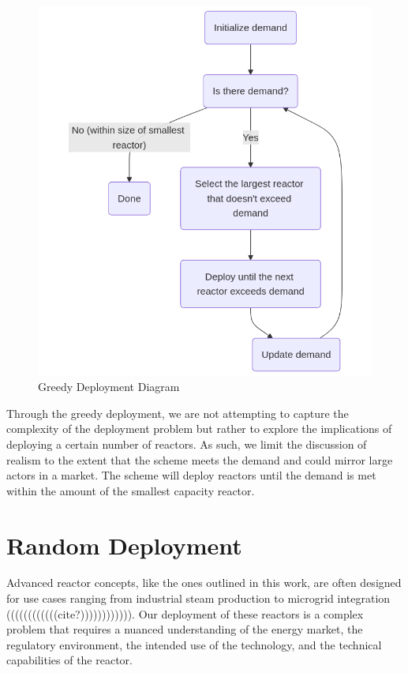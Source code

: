 \begin{figure}[!htbp]
    \centering
    \includegraphics[scale=0.4]{images/schemes/greedy_diagram.png}
    \caption{Greedy Deployment Diagram}
    \label{fig:greedy_diagram}
\end{figure}

Through the greedy deployment, we are not attempting to capture the complexity
of the deployment problem but rather to explore the implications of deploying a
certain number of reactors. As such, we limit the discussion of realism to the
extent that the scheme meets the demand and could mirror large actors in a
market. The scheme will deploy reactors until the demand is met within the
amount of the smallest capacity reactor.



\section{Random Deployment}
\label{sec:random_deployment}

Advanced reactor concepts, like the ones outlined in this work, are often
designed for use cases ranging from industrial steam production to microgrid
integration ((((((((((((cite?)))))))))))). Our deployment of these reactors is
a complex problem that requires a nuanced understanding of the energy market,
the regulatory environment, the intended use of the technology, and the
technical capabilities of the reactor.

